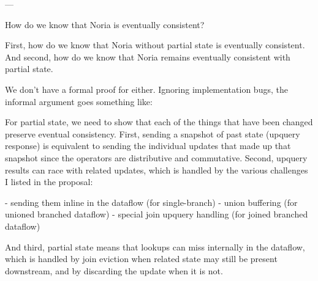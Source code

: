 ---

How do we know that Noria is eventually consistent?

First, how do we know that Noria without partial state is eventually
consistent. And second, how do we know that Noria remains eventually
consistent with partial state.

We don't have a formal proof for either. Ignoring implementation bugs, the
informal argument goes something like:

For partial state, we need to show that each of the things that have been
changed preserve eventual consistency. First, sending a snapshot of past state
(upquery response) is equivalent to sending the individual updates that made
up that snapshot since the operators are distributive and commutative. Second,
upquery results can race with related updates, which is handled by the various
challenges I listed in the proposal:

 - sending them inline in the dataflow (for single-branch)
 - union buffering (for unioned branched dataflow)
 - special join upquery handling (for joined branched dataflow)

And third, partial state means that lookups can miss internally in the
dataflow, which is handled by join eviction when related state may still be
present downstream, and by discarding the update when it is not.
